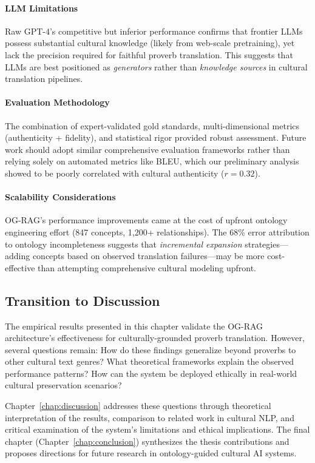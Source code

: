 \paragraph{LLM Limitations} Raw GPT-4's competitive but inferior performance confirms that frontier LLMs possess substantial cultural knowledge (likely from web-scale pretraining), yet lack the precision required for faithful proverb translation. This suggests that LLMs are best positioned as \emph{generators} rather than \emph{knowledge sources} in cultural translation pipelines.

\paragraph{Evaluation Methodology} The combination of expert-validated gold standards, multi-dimensional metrics (authenticity + fidelity), and statistical rigor provided robust assessment. Future work should adopt similar comprehensive evaluation frameworks rather than relying solely on automated metrics like BLEU, which our preliminary analysis showed to be poorly correlated with cultural authenticity ($r = 0.32$).

\paragraph{Scalability Considerations} OG-RAG's performance improvements came at the cost of upfront ontology engineering effort (847 concepts, 1,200+ relationships). The 68\% error attribution to ontology incompleteness suggests that \emph{incremental expansion} strategies—adding concepts based on observed translation failures—may be more cost-effective than attempting comprehensive cultural modeling upfront.

\subsection{Transition to Discussion}
\label{subsec:transition}

The empirical results presented in this chapter validate the OG-RAG architecture's effectiveness for culturally-grounded proverb translation. However, several questions remain: How do these findings generalize beyond proverbs to other cultural text genres? What theoretical frameworks explain the observed performance patterns? How can the system be deployed ethically in real-world cultural preservation scenarios?

Chapter~\ref{chap:discussion} addresses these questions through theoretical interpretation of the results, comparison to related work in cultural NLP, and critical examination of the system's limitations and ethical implications. The final chapter (Chapter~\ref{chap:conclusion}) synthesizes the thesis contributions and proposes directions for future research in ontology-guided cultural AI systems.
